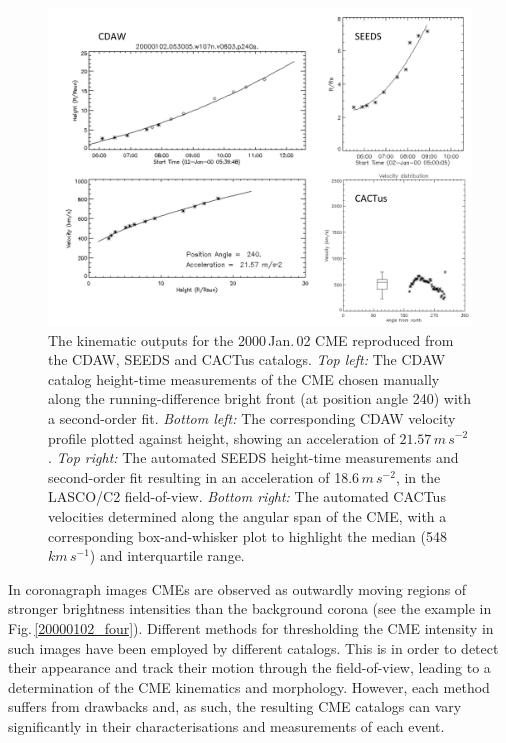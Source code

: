 \documentclass[referee,a4paper,12pt,traditabstract]{swsc}
\begin{document}
\begin{linenumbers}
\begin{figure}[!h]
\centerline{\includegraphics[scale=0.68, trim=20 0 0 0, clip=true]{images/20000102_kins_plots.pdf}}
\caption{The kinematic outputs for the 2000\,Jan.\,02 CME reproduced from the CDAW, SEEDS and CACTus catalogs. \emph{Top left:} The CDAW catalog height-time measurements of the CME chosen manually along the running-difference bright front (at position angle 240) with a second-order fit. \emph{Bottom left:} The corresponding CDAW velocity profile plotted against height, showing an acceleration of $21.57\,m\,s^{-2}$. \emph{Top right:} The automated SEEDS height-time measurements and second-order fit resulting in an acceleration of 18.6\,$m\,s^{-2}$, in the LASCO/C2 field-of-view. \emph{Bottom right:} The automated CACTus velocities determined along the angular span of the CME, with a corresponding box-and-whisker plot to highlight the median (548\,$km\,s^{-1}$) and interquartile range.}
\label{20000102_kins_plots}
\end{figure}

In coronagraph images CMEs are observed as outwardly moving regions of stronger brightness intensities than the background corona (see the example in Fig.\,\ref{20000102_four}). Different methods for thresholding the CME intensity in such images have been employed by different catalogs. This is in order to detect their appearance and track their motion through the field-of-view, leading to a determination of the CME kinematics and morphology. However, each method suffers from drawbacks and, as such, the resulting CME catalogs can vary significantly in their characterisations and measurements of each event. 



\end{linenumbers}
\end{document}
